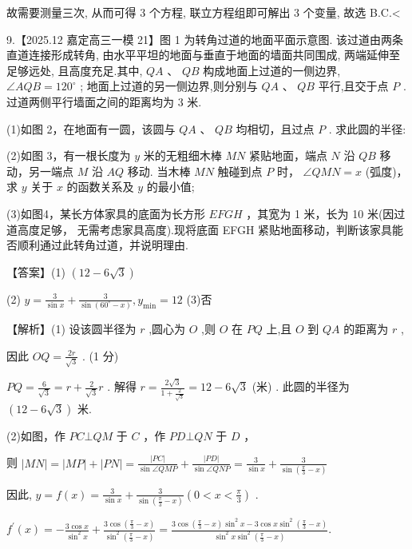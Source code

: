 \documentclass[10pt]{article}
\begin{document}
故需要测量三次, 从而可得 3 个方程, 联立方程组即可解出 3 个变量, 故选 B.C.<

9.【2025.12 嘉定高三一模 21】图 1 为转角过道的地面平面示意图. 该过道由两条直道连接形成转角, 由水平平坦的地面与垂直于地面的墙面共同围成, 两端延伸至足够远处, 且高度充足.其中, \({QA}\text{ 、 }{QB}\) 构成地面上过道的一侧边界, \(\angle {AQB} = {120}^{ \circ  }\) ; 地面上过道的另一侧边界,则分别与 \({QA}\text{ 、 }{QB}\) 平行,且交于点 \(P\) .过道两侧平行墙面之间的距离均为 3 米.

(1)如图 2，在地面有一圆，该圆与 \({QA}\text{ 、 }{QB}\) 均相切，且过点 \(P\) . 求此圆的半径:

(2)如图 3，有一根长度为 \(y\) 米的无粗细木棒 \({MN}\) 紧贴地面，端点 \(N\) 沿 \({QB}\) 移动，另一端点 \(M\) 沿 \({AQ}\) 移动. 当木棒 \({MN}\) 触碰到点 \(P\) 时， \(\angle {QMN} = x\) (弧度)，求 \(y\) 关于 \(x\) 的函数关系及 \(y\) 的最小值;

(3)如图4，某长方体家具的底面为长方形 \({EFGH}\) ，其宽为 1 米，长为 10 米(因过道高度足够， 无需考虑家具高度).现将底面 EFGH 紧贴地面移动，判断该家具能否顺利通过此转角过道，并说明理由.

【答案】(1) \(\left( {{12} - 6\sqrt{3}}\right)\)

(2) \(y = \frac{3}{\sin x} + \frac{3}{\sin \left( {{60}^{ \circ  } - x}\right) },{y}_{\min } = {12}\) (3)否

【解析】(1) 设该圆半径为 \(r\) ,圆心为 \(O\) ,则 \(O\) 在 \({PQ}\) 上,且 \(O\) 到 \({QA}\) 的距离为 \(r\) ,

因此 \({OQ} = \frac{2r}{\sqrt{3}}\) . (1 分)

\({PQ} = \frac{6}{\sqrt{3}} = r + \frac{2}{\sqrt{3}}r\) . 解得 \(r = \frac{2\sqrt{3}}{1 + \frac{2}{\sqrt{3}}} = {12} - 6\sqrt{3}\) (米) . 此圆的半径为 \(\left( {{12} - 6\sqrt{3}}\right)\) 米.

(2)如图，作 \({PC} \bot  {QM}\) 于 \(C\) ，作 \({PD} \bot  {QN}\) 于 \(D\) ，

则 \(\left| {MN}\right|  = \left| {MP}\right|  + \left| {PN}\right|  = \frac{\left| PC\right| }{\sin \angle {QMP}} + \frac{\left| PD\right| }{\sin \angle {QNP}} = \frac{3}{\sin x} + \frac{3}{\sin \left( {\frac{\pi }{3} - x}\right) }\)

因此, \(y = f\left( x\right)  = \frac{3}{\sin x} + \frac{3}{\sin \left( {\frac{\pi }{3} - x}\right) }\left( {0 < x < \frac{\pi }{3}}\right)\) .

\({f}^{\prime }\left( x\right)  =  - \frac{3\cos x}{{\sin }^{2}x} + \frac{3\cos \left( {\frac{\pi }{3} - x}\right) }{{\sin }^{2}\left( {\frac{\pi }{3} - x}\right) } = \frac{3\cos \left( {\frac{\pi }{3} - x}\right) {\sin }^{2}x - 3\cos x{\sin }^{2}\left( {\frac{\pi }{3} - x}\right) }{{\sin }^{2}x{\sin }^{2}\left( {\frac{\pi }{3} - x}\right) }.\)
\end{document}
